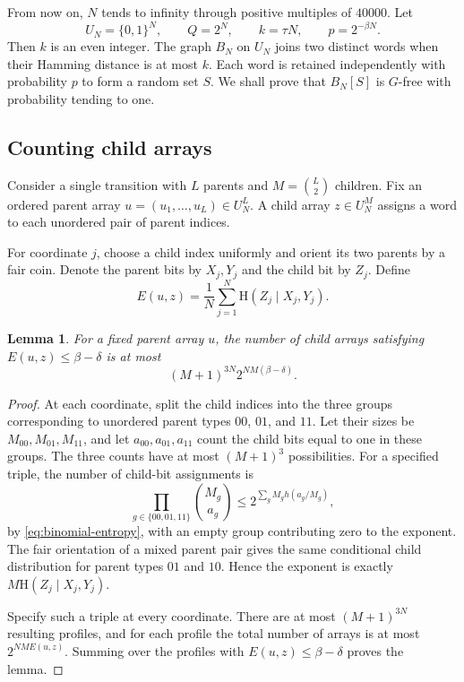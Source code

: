 \documentclass[11pt,leqno]{amsart}
\numberwithin{equation}{section}
\newtheorem{lemma}[theorem]{Lemma}
\theoremstyle{definition}
\theoremstyle{remark}
\newcommand{\HH}{\mathrm H}
\begin{document}
From now on, $N$ tends to infinity through positive multiples of $40000$. Let
\begin{equation}\label{eq:cube-parameters}
 U_N=\{0,1\}^N,\qquad Q=2^N,\qquad
 k=\tau N,\qquad p=2^{-\beta N}.
\end{equation}
Then $k$ is an even integer. The graph $B_N$ on $U_N$ joins two distinct words when their Hamming distance is at most $k$. Each word is retained independently with probability $p$ to form a random set $S$. We shall prove that $B_N[S]$ is $G$-free with probability tending to one.

\subsection{Counting child arrays}

Consider a single transition with $L$ parents and $M=\binom L2$ children. Fix an ordered parent array $u=(u_1,\ldots,u_L)\in U_N^L$. A child array $z\in U_N^M$ assigns a word to each unordered pair of parent indices.

For coordinate $j$, choose a child index uniformly and orient its two parents by a fair coin. Denote the parent bits by $X_j,Y_j$ and the child bit by $Z_j$. Define
\begin{equation}\label{eq:profile-entropy}
 E(u,z)=\frac1N\sum_{j=1}^N\HH(Z_j\mid X_j,Y_j).
\end{equation}

\begin{lemma}\label{lem:array-count}
For a fixed parent array $u$, the number of child arrays satisfying $E(u,z)\le\beta-\delta$ is at most
\begin{equation}\label{eq:array-count}
 (M+1)^{3N}2^{NM(\beta-\delta)}.
\end{equation}
\end{lemma}

\begin{proof}
At each coordinate, split the child indices into the three groups corresponding to unordered parent types $00$, $01$, and $11$. Let their sizes be $M_{00},M_{01},M_{11}$, and let $a_{00},a_{01},a_{11}$ count the child bits equal to one in these groups. The three counts have at most $(M+1)^3$ possibilities. For a specified triple, the number of child-bit assignments is
\[
 \prod_{g\in\{00,01,11\}}\binom{M_g}{a_g}
 \le 2^{\sum_g M_g h(a_g/M_g)},
\]
by \eqref{eq:binomial-entropy}, with an empty group contributing zero to the exponent. The fair orientation of a mixed parent pair gives the same conditional child distribution for parent types $01$ and $10$. Hence the exponent is exactly $M\HH(Z_j\mid X_j,Y_j)$.

Specify such a triple at every coordinate. There are at most $(M+1)^{3N}$ resulting profiles, and for each profile the total number of arrays is at most $2^{NM E(u,z)}$. Summing over the profiles with $E(u,z)\le\beta-\delta$ proves the lemma.
\end{proof}
\end{document}
